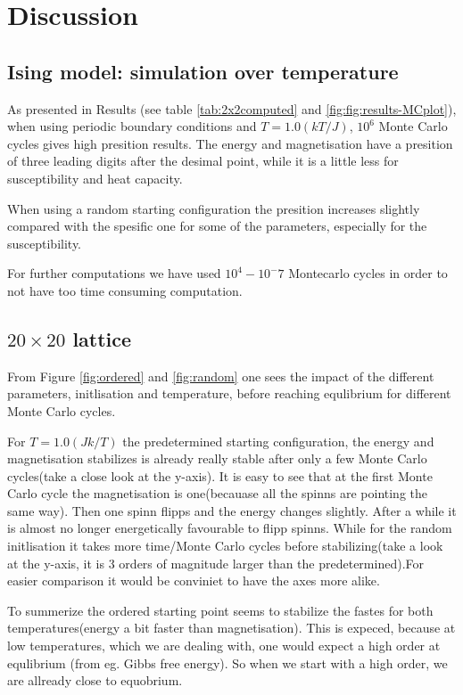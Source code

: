 \documentclass[../main.tex]{subfiles}
\begin{document}
\section{Discussion}

\subsection{Ising model: simulation over temperature}
As presented in Results (see table \ref{tab:2x2computed} and \ref{fig:fig:results-MCplot}), when using periodic boundary conditions and $T = 1.0(kT/J)$, $10^6$ Monte Carlo cycles gives high presition results. The energy and magnetisation have a presition of three leading digits after the desimal point, while it is a little less for susceptibility and heat capacity.

When using a random starting configuration the presition increases slightly compared with the spesific one for some of the parameters, especially for the susceptibility.

For further computations we have used $10^4 - 10^-7$ Montecarlo cycles in order to not have too time consuming computation.

\subsection{$20 \times 20$ lattice}

From Figure \ref{fig:ordered} and \ref{fig:random} one sees the impact of the different parameters, initlisation and temperature, before reaching equlibrium for different Monte Carlo cycles.

For $T=1.0(Jk/T)$ the predetermined starting configuration, the energy and magnetisation stabilizes is already really stable after only a few Monte Carlo cycles(take a close look at the y-axis). It is easy to see that at the first Monte Carlo cycle the magnetisation is one(becauase all the spinns are pointing the same way). Then one spinn flipps and the energy changes slightly. After a while it is almost no longer energetically favourable to flipp spinns.
While for the random initlisation it takes more time/Monte Carlo cycles before stabilizing(take a look at the y-axis, it is 3 orders of magnitude larger than the predetermined).For easier comparison it would be conviniet to have the axes more alike.

To summerize the ordered starting point seems to stabilize the fastes for both temperatures(energy a bit faster than magnetisation). This is expeced, because at low temperatures, which we are dealing with, one would expect a high order at equlibrium (from eg. Gibbs free energy). So when we start with a high order, we are allready close to equobrium.
\end{document}
